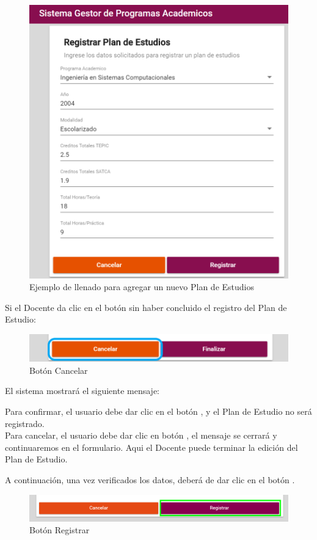 \begin{figure}[!hbtp]
    \centering
    \hypertarget{ejreg}{\includegraphics[width=0.7\linewidth]{images/SP4-GPE/registrarEjem}}
    \caption{Ejemplo de llenado para agregar un nuevo Plan de Estudios}
    \label{ejreg}
\end{figure}
\newpage
Si el Docente  da clic en el botón  sin haber concluido el registro del Plan de Estudio:

\begin{figure}[!hbtp]
    \centering
    \hypertarget{cancel2}{\includegraphics[width=0.7\linewidth]{images/SP4-GPE/cancelarPE}}
    \caption{Botón Cancelar}
    \label{cancel2}
\end{figure}

El sistema mostrará el siguiente mensaje:

Para confirmar, el usuario debe dar clic en el botón  , y el Plan de Estudio no será registrado.\\

Para cancelar, el usuario debe dar clic en botón  , el mensaje se cerrará y continuaremos en el formulario. Aqui el Docente puede terminar la edición del Plan de Estudio.

A continuación, una vez verificados los datos, deberá de dar clic en el botón .
\begin{figure}[!hbtp]
    \centering
    \hypertarget{btnreg}{\includegraphics[width=0.7\linewidth]{images/SP4-GPE/registrarB}}
    \caption{Botón Registrar}
    \label{btnreg}
\end{figure}

